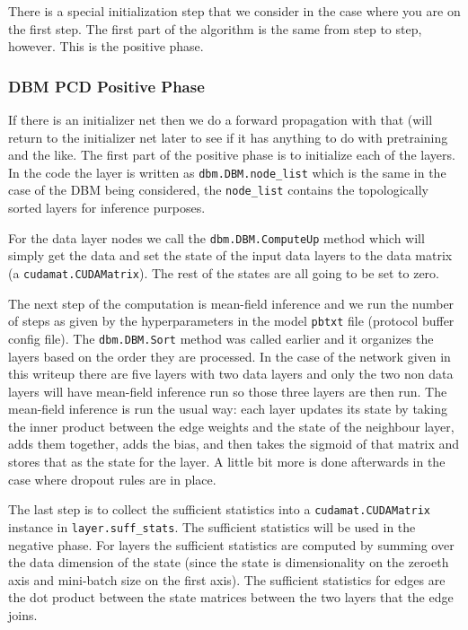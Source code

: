 \documentclass{article} %
\begin{document}
There is a special initialization step that we consider in the case where you are on the first step.  The first part of the algorithm
is the same from step to step, however.  This is the positive phase.

\subsubsection{DBM PCD Positive Phase}

If there is an initializer net then we do a forward propagation with
that (will return to the initializer net later to see if it has
anything to do with pretraining and the like.  The first part of the
positive phase is to initialize each of the layers.  In the code the
layer is written as \texttt{dbm.DBM.node\_list} which is the same in
the case of the DBM being considered, the \texttt{node\_list} contains
the topologically sorted layers for inference purposes. 

For the data layer nodes we call the \texttt{dbm.DBM.ComputeUp} method
which will simply get the data and set the state of the input data layers
to the data matrix (a \texttt{cudamat.CUDAMatrix}).  The rest of the states
are all going to be set to zero.

The next step of the computation is mean-field inference
and we run the number of steps as given by the hyperparameters in the model
\texttt{pbtxt} file (protocol buffer config file).  The \texttt{dbm.DBM.Sort}
method was called earlier and it organizes the layers based on the order they are processed. In the case of
the network given in this writeup there are five layers with two data layers and only the two non data layers
will have mean-field inference run so those three layers are then run.  The mean-field inference is run the usual way:
each layer updates its state by taking the inner product between the edge weights and the state of the neighbour layer,
adds them together, adds the bias, and then takes the sigmoid of that matrix and stores that as the state for the layer.  
A little bit more is done afterwards in the case where dropout rules are in place.

The last step is to collect the sufficient statistics into a
\texttt{cudamat.CUDAMatrix} instance in \texttt{layer.suff\_stats}.
The sufficient statistics will be used in the negative phase. For
layers the sufficient statistics are computed by summing over the data
dimension of the state (since the state is dimensionality on the
zeroeth axis and mini-batch size on the first axis).  The sufficient
statistics for edges are the dot product between the state matrices
between the two layers that the edge joins.
\end{document}
